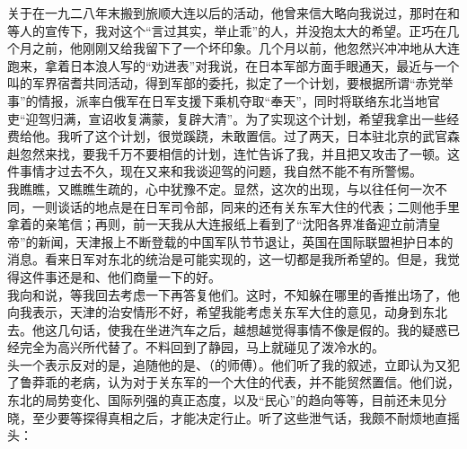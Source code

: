 关于在一九二八年末搬到旅顺大连以后的活动，他曾来信大略向我说过，那时在和等人的宣传下，我对这个“言过其实，举止乖”的人，并没抱太大的希望。正巧在几个月之前，他刚刚又给我留下了一个坏印象。几个月以前，他忽然兴冲冲地从大连跑来，拿着日本浪人写的“劝进表”对我说，在日本军部方面手眼通天，最近与一个叫的军界宿耆共同活动，得到军部的委托，拟定了一个计划，要根据所谓“赤党举事”的情报，派率白俄军在日军支援下乘机夺取“奉天”，同时将联络东北当地官吏“迎驾归满，宣诏收复满蒙，复辟大清”。为了实现这个计划，希望我拿出一些经费给他。我听了这个计划，很觉蹊跷，未敢置信。过了两天，日本驻北京的武官森赳忽然来找，要我千万不要相信的计划，连忙告诉了我，并且把又攻击了一顿。这件事情才过去不久，现在又来和我谈迎驾的问题，我自然不能不有所警惕。\\

我瞧瞧，又瞧瞧生疏的，心中犹豫不定。显然，这次的出现，与以往任何一次不同，一则谈话的地点是在日军司令部，同来的还有关东军大住的代表；二则他手里拿着的亲笔信；再则，前一天我从大连报纸上看到了“沈阳各界准备迎立前清皇帝”的新闻，天津报上不断登载的中国军队节节退让，英国在国际联盟袒护日本的消息。看来日军对东北的统治是可能实现的，这一切都是我所希望的。但是，我觉得这件事还是和、他们商量一下的好。\\

我向和说，等我回去考虑一下再答复他们。这时，不知躲在哪里的香推出场了，他向我表示，天津的治安情形不好，希望我能考虑关东军大住的意见，动身到东北去。他这几句话，使我在坐进汽车之后，越想越觉得事情不像是假的。我的疑惑已经完全为高兴所代替了。不料回到了静园，马上就碰见了泼冷水的。\\

头一个表示反对的是，追随他的是、（的师傅）。他们听了我的叙述，立即认为又犯了鲁莽乖的老病，认为对于关东军的一个大住的代表，并不能贸然置信。他们说，东北的局势变化、国际列强的真正态度，以及“民心”的趋向等等，目前还未见分晓，至少要等探得真相之后，才能决定行止。听了这些泄气话，我颇不耐烦地直摇头：\\

